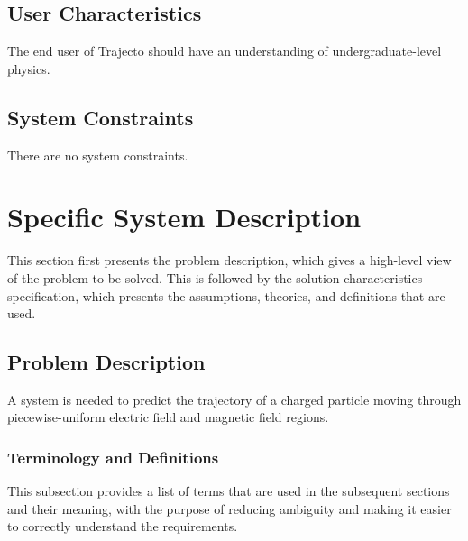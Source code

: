 \documentclass[12pt]{article}
\begin{document}
\subsection{User Characteristics}
\label{Sec:UserChars}
The end user of Trajecto should have an understanding of undergraduate-level physics.

\subsection{System Constraints}
\label{Sec:SysConstraints}
There are no system constraints.

\section{Specific System Description}
\label{Sec:SpecSystDesc}
This section first presents the problem description, which gives a high-level view of the problem to be solved. This is followed by the solution characteristics specification, which presents the assumptions, theories, and definitions that are used.

\subsection{Problem Description}
\label{Sec:ProbDesc}
A system is needed to predict the trajectory of a charged particle moving through piecewise-uniform electric field and magnetic field regions.

\subsubsection{Terminology and Definitions}
\label{Sec:TermDefs}
This subsection provides a list of terms that are used in the subsequent sections and their meaning, with the purpose of reducing ambiguity and making it easier to correctly understand the requirements.
\end{document}
